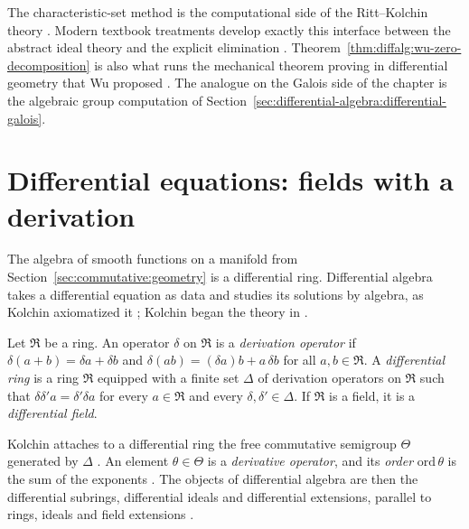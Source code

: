 The characteristic-set method is the computational side of the
Ritt--Kolchin theory \cite[pp.~175--184]{Wu1987RittConstructive}.
Modern textbook treatments \cite[pp.~245--261]{HubbardLundell2011}
develop exactly this interface between the abstract ideal theory and the
explicit elimination \cite[pp.~245--250]{HubbardLundell2011}.
Theorem~\ref{thm:diffalg:wu-zero-decomposition} is also what runs the
mechanical theorem proving in differential geometry that Wu proposed
\cite[pp.~175--184]{Wu1987RittConstructive}. The analogue on the Galois
side of the chapter is the algebraic group computation of
Section~\ref{sec:differential-algebra:differential-galois}.

\section{Differential equations: fields with a derivation}\label{sec:differential-algebra:differential-equations}

The algebra of smooth functions on a manifold from
Section~\ref{sec:commutative:geometry} is a differential ring. Differential
algebra takes a differential equation as data and studies its solutions by
algebra, as Kolchin axiomatized it \cite{Kolchin1973}; Kolchin
began the theory in \cite[\S I.1]{Kolchin1973}.

\begin{definition}\label{def:diffalg:kolchin-diff-ring}
Let $\mathfrak{R}$ be a ring. An operator $\delta$ on $\mathfrak{R}$ is a
\emph{derivation operator} if $\delta(a+b)=\delta a+\delta b$ and
$\delta(ab)=(\delta a)b+a\,\delta b$ for all $a,b\in\mathfrak{R}$. A
\emph{differential ring} is a ring $\mathfrak{R}$ equipped with a finite set
$\Delta$ of derivation operators on $\mathfrak{R}$ such that
$\delta\delta'a=\delta'\delta a$ for every $a\in\mathfrak{R}$ and every
$\delta,\delta'\in\Delta$. If $\mathfrak{R}$ is a field, it is a
\emph{differential field}.
\end{definition}

Kolchin attaches to a differential ring the free commutative semigroup
$\Theta$ generated by $\Delta$ \cite[\S I.1, p.~59]{Kolchin1973}. An element
$\theta\in\Theta$ is a \emph{derivative operator}, and its \emph{order}
$\mathrm{ord}\,\theta$ is the sum of the exponents
\cite[\S I.1, p.~59]{Kolchin1973}. The objects of
differential algebra are then the differential subrings, differential ideals
and differential extensions, parallel to rings, ideals and field extensions
\cite[\S I.1, p.~59]{Kolchin1973}.

